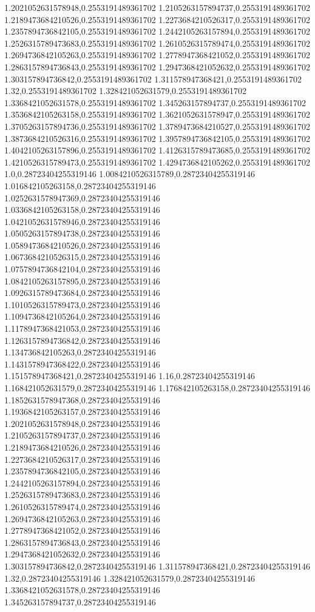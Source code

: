 1.2021052631578948,0.2553191489361702
1.2105263157894737,0.2553191489361702
1.2189473684210526,0.2553191489361702
1.2273684210526317,0.2553191489361702
1.2357894736842105,0.2553191489361702
1.2442105263157894,0.2553191489361702
1.2526315789473683,0.2553191489361702
1.2610526315789474,0.2553191489361702
1.2694736842105263,0.2553191489361702
1.2778947368421052,0.2553191489361702
1.2863157894736843,0.2553191489361702
1.2947368421052632,0.2553191489361702
1.303157894736842,0.2553191489361702
1.311578947368421,0.2553191489361702
1.32,0.2553191489361702
1.328421052631579,0.2553191489361702
1.3368421052631578,0.2553191489361702
1.345263157894737,0.2553191489361702
1.3536842105263158,0.2553191489361702
1.3621052631578947,0.2553191489361702
1.3705263157894736,0.2553191489361702
1.3789473684210527,0.2553191489361702
1.3873684210526316,0.2553191489361702
1.3957894736842105,0.2553191489361702
1.4042105263157896,0.2553191489361702
1.4126315789473685,0.2553191489361702
1.4210526315789473,0.2553191489361702
1.4294736842105262,0.2553191489361702
1.0,0.28723404255319146
1.0084210526315789,0.28723404255319146
1.016842105263158,0.28723404255319146
1.0252631578947369,0.28723404255319146
1.0336842105263158,0.28723404255319146
1.0421052631578946,0.28723404255319146
1.0505263157894738,0.28723404255319146
1.0589473684210526,0.28723404255319146
1.0673684210526315,0.28723404255319146
1.0757894736842104,0.28723404255319146
1.0842105263157895,0.28723404255319146
1.0926315789473684,0.28723404255319146
1.1010526315789473,0.28723404255319146
1.1094736842105264,0.28723404255319146
1.1178947368421053,0.28723404255319146
1.1263157894736842,0.28723404255319146
1.134736842105263,0.28723404255319146
1.1431578947368422,0.28723404255319146
1.151578947368421,0.28723404255319146
1.16,0.28723404255319146
1.168421052631579,0.28723404255319146
1.176842105263158,0.28723404255319146
1.1852631578947368,0.28723404255319146
1.1936842105263157,0.28723404255319146
1.2021052631578948,0.28723404255319146
1.2105263157894737,0.28723404255319146
1.2189473684210526,0.28723404255319146
1.2273684210526317,0.28723404255319146
1.2357894736842105,0.28723404255319146
1.2442105263157894,0.28723404255319146
1.2526315789473683,0.28723404255319146
1.2610526315789474,0.28723404255319146
1.2694736842105263,0.28723404255319146
1.2778947368421052,0.28723404255319146
1.2863157894736843,0.28723404255319146
1.2947368421052632,0.28723404255319146
1.303157894736842,0.28723404255319146
1.311578947368421,0.28723404255319146
1.32,0.28723404255319146
1.328421052631579,0.28723404255319146
1.3368421052631578,0.28723404255319146
1.345263157894737,0.28723404255319146
